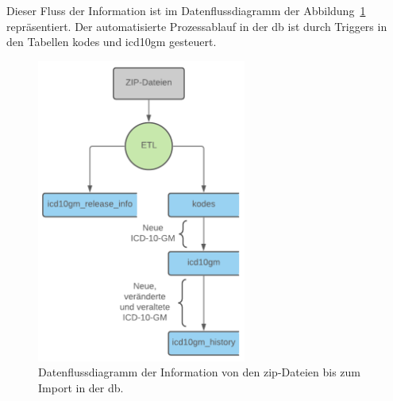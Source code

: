 Dieser Fluss der Information ist im Datenflussdiagramm der Abbildung~\ref{fig:dbflow} repräsentiert. Der automatisierte Prozessablauf in der \ac{db} ist durch Triggers in den Tabellen \textsf{kodes} und \textsf{icd10gm} gesteuert.

\begin{figure}[ht]
	\centering
	\includegraphics[height=10cm]{figures/dbflow}
	\caption[Datenfluss des Prozesses]{Datenflussdiagramm der Information von den \ac{zip}-Dateien bis zum Import in der \ac{db}.}
	\label{fig:dbflow}
\end{figure} 